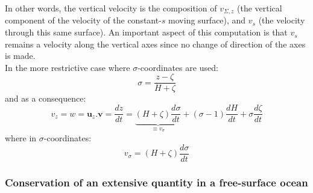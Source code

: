 In other words, the vertical velocity is the composition of $v_{\Sigma,z}$ (the vertical component of the velocity of the constant-$s$ moving surface), and $v_s$ (the velocity through this same surface). An important aspect of this computation is that $v_s$ remains a velocity along the vertical axes since no change of direction of the axes is made.\\
In the more restrictive case where $\sigma$-coordinates are used:
\begin{equation}
 \displaystyle
 \sigma=\frac{z-\zeta}{H+\zeta}
\end{equation}
and as a consequence:
\begin{equation}
 \displaystyle
 v_z=w=\mathbf{u}_z.\mathbf{v}
=\frac{dz}{dt}=\underbrace{(H+\zeta)\frac{d\sigma}{dt}}_{\equiv v_{\sigma}}
 +(\sigma-1)\frac{dH}{dt}
 +\sigma\frac{d\zeta}{dt}
\end{equation}
where in $\sigma$-coordinates:
\begin{equation}
 \displaystyle
v_{\sigma}=(H+\zeta)\frac{d\sigma}{dt}
\end{equation}

\subsubsection{Conservation of an extensive quantity in a free-surface ocean}


